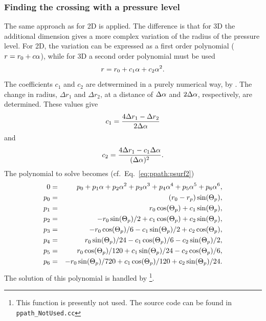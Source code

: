 \subsubsection{Finding the crossing with a pressure level}
\label{sec:ppath:3dplevel}

The same approach as for 2D is applied. The difference is that for 3D the
additional dimension gives a more complex variation of the radius of the
pressure level. For 2D, the variation can be expressed as a first order
polynomial ($r=r_{0}+c\alpha$), while for 3D a second order polynomial must be
used
\begin{equation}
  r = r_{0}+c_1\alpha+c_2\alpha^2.
\end{equation}
The coefficients $c_1$ and $c_2$ are detwermined in a purely numerical way, by
. The change in radius, $\Delta r_1$ and
$\Delta r_2$, at a distance of $\Delta\alpha$ and $2\Delta\alpha$, respectively, are
determined. These values give
\begin{equation}
  c_1 = \frac{4\Delta r_1 - \Delta r_2}{2\Delta\alpha}
\end{equation}
and
\begin{equation}
  c_2 = \frac{4\Delta r_1 - c_1\Delta\alpha}{(\Delta\alpha)^2}.
\end{equation}
The polynomial to solve becomes (cf.\ Eq.~\ref{eq:ppath:psurf2})
\begin{eqnarray}
    0 & = & p_0 + p_1 \alpha + p_2 \alpha^2 + p_3 \alpha^3 + p_4 \alpha^4 + 
                  p_5 \alpha^5 + p_6 \alpha^6, \\
  p_0 & = & (r_{0}-r_{p}) \sin(\Theta_p),                    \nonumber \\ 
  p_1 & = &   r_{0}\cos(\Theta_p)    + c_1 \sin(\Theta_p),      \nonumber \\ 
  p_2 & = & -r_{0}\sin(\Theta_p)/2   + c_1 \cos(\Theta_p)  
                                        + c_2 \sin(\Theta_p),      \nonumber \\ 
  p_3 & = & -r_{0}\cos(\Theta_p)/6   - c_1 \sin(\Theta_p)/2    
                                        + c_2 \cos(\Theta_p),      \nonumber \\ 
  p_4 & = &  r_{0}\sin(\Theta_p)/24  - c_1 \cos(\Theta_p)/6
                                        - c_2 \sin(\Theta_p)/2,    \nonumber \\
  p_5 & = &  r_{0}\cos(\Theta_p)/120 + c_1 \sin(\Theta_p)/24   
                                        - c_2 \cos(\Theta_p)/6,    \nonumber \\
  p_6 & = & -r_{0}\sin(\Theta_p)/720 + c_1 \cos(\Theta_p)/120  
                                        + c_2 \sin(\Theta_p)/24.   \nonumber
  \label{eq:ppath:psurf2}
\end{eqnarray}
The solution of this polynomial is handled by
\footnote{This function is presently not used.
  The source code can be found in \texttt{ppath\_NotUsed.cc}}.



